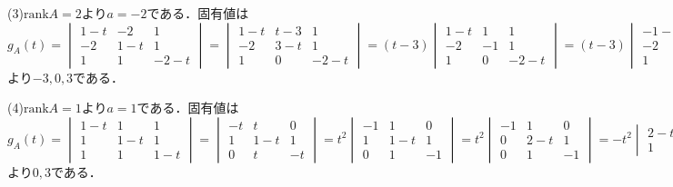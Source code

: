 \documentclass[
		book,
		head_space=20mm,
		foot_space=20mm,
		gutter=10mm,
		line_length=190mm
]{jlreq}
\begin{document}
(3)$\mathrm{rank} A=2$より$a=-2$である．固有値は
$g_A(t)=\begin{vmatrix}
    1-t & -2 & 1\\
    -2 & 1-t & 1\\
    1 & 1 & -2-t
\end{vmatrix}=\begin{vmatrix}
    1-t & t-3 & 1\\
    -2 & 3-t & 1\\
    1 & 0 & -2-t
    \end{vmatrix}=(t-3)\begin{vmatrix}
        1-t & 1 & 1\\
        -2 & -1 & 1\\
        1 & 0 & -2-t 
        \end{vmatrix}=(t-3)\begin{vmatrix}
            -1-t & 0 & 2\\
            -2 & -1 & 1\\
            1 & 0 & -2-t
        \end{vmatrix}
        =(t-3)(-1)\begin{vmatrix}
            -1-t & 2\\
            1 & -2-t
            \end{vmatrix}=-(t-3)((-1-t)(-2-t)-2)=-(t-3)t(t+3)$より$-3,0,3$である．

(4)$\mathrm{rank}A=1$より$a=1$である．固有値は
$g_A(t)=\begin{vmatrix}
    1-t & 1 & 1\\
    1 & 1-t & 1\\
    1 & 1 & 1-t
    \end{vmatrix}=\begin{vmatrix}
        -t & t & 0\\
        1 & 1-t & 1\\
        0 & t & -t
        \end{vmatrix}=t^2\begin{vmatrix}
            -1 & 1 & 0\\
            1 & 1-t & 1\\
            0 & 1 & -1
            \end{vmatrix}=t^2\begin{vmatrix}
                -1 & 1 & 0\\
                0 & 2-t & 1\\
                0 & 1 & -1
        \end{vmatrix}=-t^2\begin{vmatrix}
            2-t & 1\\
            1 & -1
        \end{vmatrix}=-t^2(-(2-t)-1)=t^2(t-3)$より$0,3$である．
\end{document}
